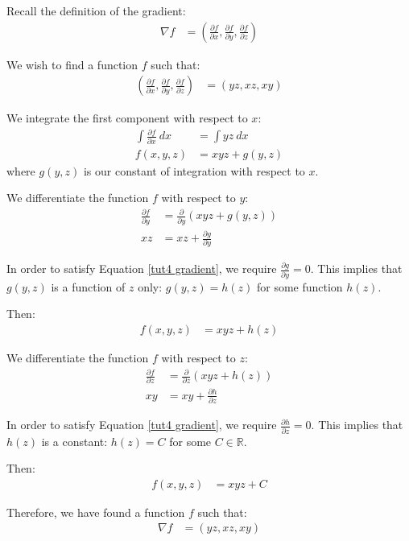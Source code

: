 \begin{solution}
    Recall the definition of the gradient:
    \begin{align}
        \nabla f &= \left(\frac{\partial f}{\partial x}, \frac{\partial f}{\partial y}, \frac{\partial f}{\partial z}\right)
    \end{align}
    
    We wish to find a function \(f\) such that:
    \begin{align}
        \left(\frac{\partial f}{\partial x}, \frac{\partial f}{\partial y}, \frac{\partial f}{\partial z}\right) &= (yz, xz, xy) \label{tut4 gradient}
    \end{align}
    
    We integrate the first component with respect to \(x\):
    \begin{align*}
        \int \frac{\partial f}{\partial x} \ dx &= \int yz \ dx \\
        f(x, y, z) &= xyz + g(y, z)
    \end{align*}
    where \(g(y, z)\) is our constant of integration with respect to \(x\). 
    
    We differentiate the function \(f\) with respect to \(y\):
    \begin{align*}
        \frac{\partial f}{\partial y} &= \frac{\partial}{\partial y}\left(xyz + g(y, z)\right) \\
        xz &= xz + \frac{\partial g}{\partial y}
    \end{align*}
    
    In order to satisfy Equation \eqref{tut4 gradient}, we require \(\frac{\partial g}{\partial y} = 0\). This implies that \(g(y, z)\) is a function of \(z\) only: \(g(y, z) =  h(z)\) for some function \(h(z)\).
    
    Then:
    \begin{align*}
        f(x, y, z) &= xyz + h(z)
    \end{align*}
    
    We differentiate the function \(f\) with respect to \(z\):
    \begin{align*}
        \frac{\partial f}{\partial z} &= \frac{\partial}{\partial z}\left(xyz + h(z)\right) \\
        xy &= xy + \frac{\partial h}{\partial z}
    \end{align*}
    
    In order to satisfy Equation \eqref{tut4 gradient}, we require \(\frac{\partial h}{\partial z} = 0\). This implies that \(h(z)\) is a constant: \(h(z) =  C\) for some \(C \in \mathbb{R}\).
    
    Then:
    \begin{align*}
        f(x, y, z) &= xyz + C
    \end{align*}
    
    Therefore, we have found a function \(f\) such that:
    \begin{align}
        \nabla f &= (yz, xz, xy)
    \end{align}
    
\end{solution}

